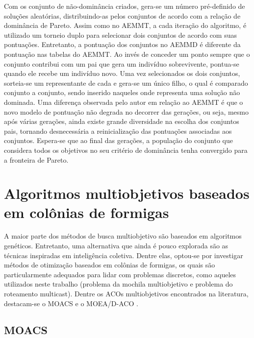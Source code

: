 Com os conjunto de não-dominância criados, gera-se um número pré-definido de soluções aleatórias, distribuindo-as pelos conjuntos de acordo com a relação de dominância de Pareto. Assim como no AEMMT, a cada iteração do algoritmo, é utilizado um torneio duplo para selecionar dois conjuntos de acordo com suas pontuações. Entretanto, a pontuação dos conjuntos no AEMMD é diferente da pontuação nas tabelas do AEMMT. Ao invés de conceder um ponto sempre que o conjunto contribui com um pai que gera um indivíduo sobrevivente, pontua-se quando ele recebe um indivíduo novo. Uma vez selecionados os dois conjuntos, sorteia-se um representante de cada e gera-se um único filho, o qual é comparado conjunto a conjunto, sendo inserido naqueles onde representa uma solução não dominada. Uma diferença observada pelo autor em relação ao AEMMT é que o novo modelo de pontuação não degrada no decorrer das gerações, ou seja, mesmo após várias gerações, ainda existe grande diversidade na escolha dos conjuntos pais, tornando desnecessária a reinicialização das pontuações associadas aos conjuntos. Espera-se que ao final das gerações, a população do conjunto que considera todos os objetivos no seu critério de dominância tenha convergido para a fronteira de Pareto. 

\section{Algoritmos multiobjetivos baseados em colônias de formigas}

A maior parte dos métodos de busca multiobjetivo são baseados em algoritmos genéticos. Entretanto, uma alternativa que ainda é pouco explorada são as técnicas inspiradas em inteligência coletiva. Dentre elas, optou-se por investigar métodos de otimização baseados em colônias de formigas, os quais são particularmente adequados para lidar com problemas discretos, como aqueles utilizados neste trabalho (problema da mochila multiobjetivo e problema do roteamento multicast). Dentre os ACOs multiobjetivos encontrados na literatura, destacam-se o MOACS \cite{Baran2003} e o MOEA/D-ACO \cite{Ke2013}.

\subsection{MOACS}

